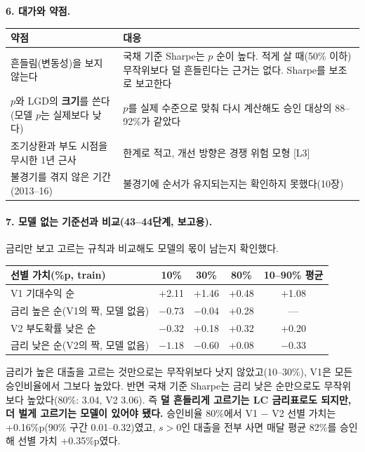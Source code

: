 \medskip\noindent\textbf{6. 대가와 약점.}\par
\begin{table}[H]\centering\small
\begin{tabularx}{\linewidth}{@{}>{\raggedright\arraybackslash}p{46mm}L@{}}\toprule
약점 & 대응\\\midrule
흔들림(변동성)을 보지 않는다 & 국채 기준 Sharpe는 $p$ 순이 높다. 적게 살 때(50\% 이하) 무작위보다 덜 흔들린다는 근거는 없다. Sharpe를 보조로 보고한다\\
$p$와 LGD의 \textbf{크기}를 쓴다(모델 $p$는 실제보다 낮다) & $p$를 실제 수준으로 맞춰 다시 계산해도 승인 대상의 88--92\%가 같았다\\
조기상환과 부도 시점을 무시한 1년 근사 & 한계로 적고, 개선 방향은 경쟁 위험 모형 [L3]\\
불경기를 겪지 않은 기간(2013--16) & 불경기에 순서가 유지되는지는 확인하지 못했다(10장)\\\bottomrule
\end{tabularx}
\end{table}

\paragraph{7. 모델 없는 기준선과 비교(43--44단계, 보고용).}
금리만 보고 고르는 규칙과 비교해도 모델의 몫이 남는지 확인했다.
\begin{table}[H]\centering\small
\begin{tabular}{@{}lcccc@{}}\toprule
선별 가치(\%p, train) & 10\% & 30\% & 80\% & 10--90\% 평균\\\midrule
V1 기대수익 순 & +2.11 & +1.46 & +0.48 & +1.08\\
금리 높은 순(V1의 짝, 모델 없음) & $-0.73$ & $-0.04$ & +0.28 & ---\\
V2 부도확률 낮은 순 & $-0.32$ & +0.18 & +0.32 & +0.20\\
금리 낮은 순(V2의 짝, 모델 없음) & $-1.18$ & $-0.60$ & +0.08 & $-0.33$\\\bottomrule
\end{tabular}
\end{table}
금리가 높은 대출을 고르는 것만으로는 무작위보다 낫지 않았고(10--30\%), V1은 모든 승인비율에서 그보다 높았다. 반면 국채 기준 Sharpe는 금리 낮은 순만으로도 무작위보다 높았다(80\%: 3.04, V2 3.06). 즉 \textbf{덜 흔들리게 고르기는 LC 금리표로도 되지만, 더 벌게 고르기는 모델이 있어야 됐다.} 승인비율 80\%에서 V1 $-$ V2 선별 가치는 +0.16\%p(90\% 구간 0.01--0.32)였고, $s>0$인 대출을 전부 사면 매달 평균 82\%를 승인해 선별 가치 +0.35\%p였다.

